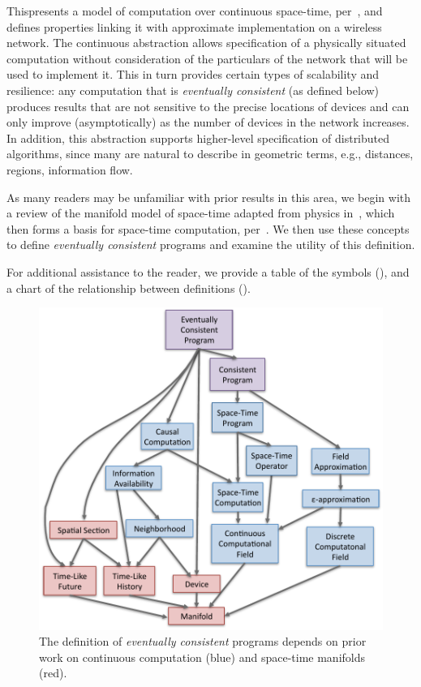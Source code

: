 \documentclass[12pt,a4paper,twoside,openright]{book}
\begin{document}
This\levelText{}presents a model of computation over continuous space-time, per~\cite{bealBasisSCW10,BVD-SCW14,BealUsbeck12},  and defines properties linking it with approximate implementation on a wireless network.
%
The continuous abstraction allows specification of a physically situated computation without consideration of the particulars of the network that will be used to implement it.
%
This in turn provides certain types of scalability and resilience: any computation that is {\em eventually consistent} (as defined below) produces results that are not sensitive to the precise locations of devices and can only improve (asymptotically) as the number of devices in the network increases.
%
In addition, this abstraction supports higher-level specification of distributed algorithms, since many are natural to describe in geometric terms, e.g., distances, regions, information flow.

As many readers may be unfamiliar with prior results in this area, we begin with a review of the manifold model of space-time adapted from physics in~\cite{upp,bealBasisSCW10}, which then forms a basis for space-time computation, per~\cite{bealBasisSCW10,BVD-SCW14,BealUsbeck12}.
%
We then use these concepts to define {\em eventually consistent} programs and examine the utility of this definition.

For additional assistance to the reader, we provide a table of the symbols (), and a chart of the relationship between definitions ().

\begin{figure}
\centering
\includegraphics[width=0.8\columnwidth]{img/definitions}
\caption[Continuous computation and space-time manifolds]{The definition of {\em eventually consistent} programs depends on prior work on continuous computation (blue) and space-time manifolds (red).}
\label{f:definitions}
\end{figure}
\end{document}

